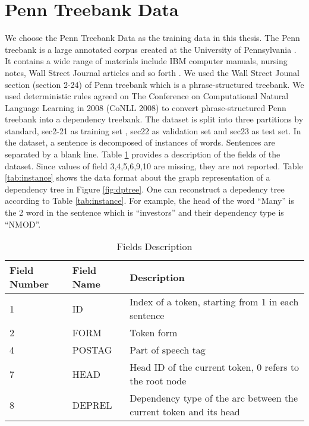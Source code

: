 \section{Penn Treebank Data}
\label{sec:penn}
We choose the Penn Treebank Data as the training data in this thesis. The Penn treebank is a large annotated corpus created at the University of Pennsylvania \cite{marcus1993building}. It contains a wide range of materials include IBM computer manuals, nursing notes, Wall Street Journal articles and so forth \cite{taylor2003penn}. We used the Wall Street Jounal section (section 2-24) of Penn treebank which is a phrase-structured treebank. We used deterministic rules agreed on The Conference on Computational Natural Language Learning in 2008 (CoNLL 2008) \cite{surdeanu2008conll} to convert phrase-structured Penn treebank into a dependency treebank.
The dataset is split into three partitions by standard, sec2-21 as training set , sec22 as validation set and sec23 as test set. In the dataset, a sentence is decomposed of instances of words. Sentences are separated by a blank line. Table \ref{tab:data} provides a description of the fields of the dataset. Since values of field 3,4,5,6,9,10 are missing, they are not reported. Table \ref{tab:instance} shows the data format about the graph representation of a dependency tree in Figure \ref{fig:dptree}. One can reconstruct a depedency tree according to Table \ref{tab:instance}. For example, the head of the word ``Many'' is the 2 word in the sentence which is ``investors'' and their dependency type is ``NMOD''. 

\begin{table}
\centering
    \begin{tabular}{ l  l  p{8cm} }\toprule
    Field Number & Field Name & Description\\  \midrule
    1 & ID & Index of a token, starting from 1 in each sentence\\ 
    2 & FORM & Token form  \\ 
    4 & POSTAG & Part of speech tag\\ 
    7 & HEAD & Head ID of the current token, 0 refers to the root node\\ 
    8 & DEPREL & Dependency type of the arc between the current token and its head \\ 
    \bottomrule
    \end{tabular}
    \caption{Fields Description}\label{tab:data}
\end{table}

